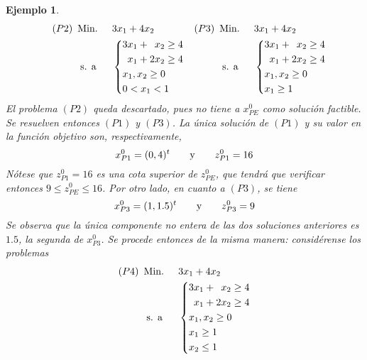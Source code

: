 \documentclass[11pt]{report}
\theoremstyle{mytheorem}
\theoremstyle{mydefinition}
\theoremstyle{myexample}
\newtheorem*{example}{Ejemplo}
\begin{document}
\begin{example}
\[\begin{aligned}[t]
\end{aligned} \quad \begin{aligned}[t]
(P2)\ \,&\text{Min. } && 3x_1+4x_2 \\
& \; \text{s. a} &&\left\{\begin{alignedat}{10}
& 3&x_1 & {}+{} &  &x_2 & {}\geq{} &4 \\
&  &x_1 & {}+{} & 2&x_2 & {}\geq{} &4 \\
&\mathrlap{x_1,x_2 \geq 0} \\
&\mathrlap{0 < x_1 < 1} \\
\end{alignedat}\right.
\end{aligned} \quad \begin{aligned}[t]
(P3)\ \,&\text{Min. } && 3x_1+4x_2 \\
& \; \text{s. a} &&\left\{\begin{alignedat}{10}
& 3&x_1 & {}+{} &  &x_2 & {}\geq{} &4 \\
&  &x_1 & {}+{} & 2&x_2 & {}\geq{} &4 \\
&\mathrlap{x_1,x_2 \geq 0} \\
&\mathrlap{x_1 \geq 1} \\
\end{alignedat}\right.
\end{aligned}\]
El problema $(P2)$ queda descartado, pues no tiene a $x^0_{PE}$ como solución factible. Se resuelven entonces $(P1)$ y $(P3)$. La única solución de $(P1)$ y su valor en la función objetivo son, respectivamente,
\[x^0_{P1} = (0,4)^t \qquad \textup{y} \qquad z^0_{P1} = 16\]
Nótese que $z^0_{P1}= 16$ es una cota superior de $z^0_{PE}$, que tendrá que verificar entonces $9 \leq z^0_{PE} \leq 16$. Por otro lado, en cuanto a $(P3)$, se tiene
\[x^0_{P3} = (1,1.5)^t \qquad \textup{y} \qquad z^0_{P3} = 9\]
Se observa que la única componente no entera de las dos soluciones anteriores es $1.5$, la segunda de $x^0_{P3}$. Se procede entonces de la misma manera: considérense los problemas
\[\begin{aligned}[t]
(P4)\ \,&\text{Min. } && 3x_1+4x_2 \\
& \; \text{s. a} &&\left\{\begin{alignedat}{10}
& 3&x_1 & {}+{} &  &x_2 & {}\geq{} &4 \\
&  &x_1 & {}+{} & 2&x_2 & {}\geq{} &4 \\
&\mathrlap{x_1,x_2 \geq 0} \\
&\mathrlap{x_1 \geq 1} \\
&\mathrlap{x_2 \leq 1}
\end{alignedat}\right.

\end{aligned}\]
\end{example}
\end{document}
